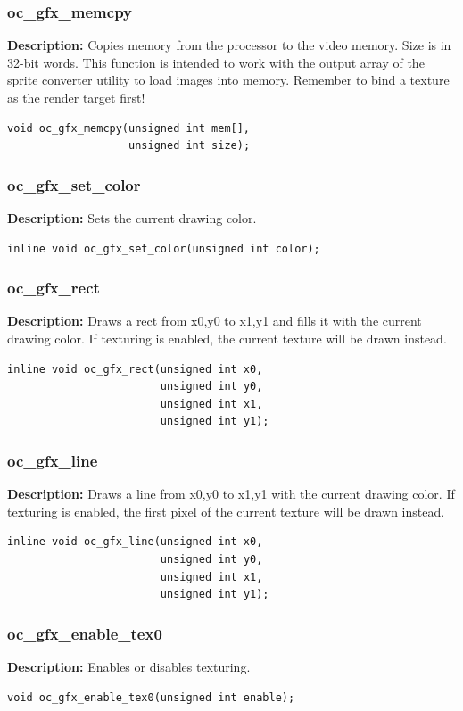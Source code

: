 \documentclass[10pt,a4paper]{article}
\begin{document}
\subsubsection{oc\_gfx\_memcpy}
\textbf{Description:} Copies memory from the processor to the video memory. Size is in 32-bit words. This function is intended to work with the output array of the sprite converter utility to load images into memory. Remember to bind a texture as the render target first!
\begin{lstlisting}
void oc_gfx_memcpy(unsigned int mem[],
                   unsigned int size);
\end{lstlisting}

\subsubsection{oc\_gfx\_set\_color}
\textbf{Description:} Sets the current drawing color.
\begin{lstlisting}
inline void oc_gfx_set_color(unsigned int color);
\end{lstlisting}

\subsubsection{oc\_gfx\_rect}
\textbf{Description:} Draws a rect from x0,y0 to x1,y1 and fills it with the current drawing color. If texturing is enabled, the current texture will be drawn instead.
\begin{lstlisting}
inline void oc_gfx_rect(unsigned int x0, 
                        unsigned int y0, 
                        unsigned int x1, 
                        unsigned int y1);
\end{lstlisting}

\subsubsection{oc\_gfx\_line}
\textbf{Description:} Draws a line from x0,y0 to x1,y1 with the current drawing color. If texturing is enabled, the first pixel of the current texture will be drawn instead.
\begin{lstlisting}
inline void oc_gfx_line(unsigned int x0, 
                        unsigned int y0, 
                        unsigned int x1, 
                        unsigned int y1);
\end{lstlisting}

\subsubsection{oc\_gfx\_enable\_tex0}
\textbf{Description:} Enables or disables texturing.
\begin{lstlisting}
void oc_gfx_enable_tex0(unsigned int enable);
\end{lstlisting}
\end{document}

